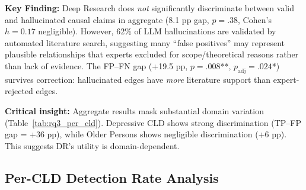 \textbf{Key Finding:} Deep Research does \textit{not} significantly discriminate between valid and hallucinated causal claims in aggregate (8.1 pp gap, $p=.38$, Cohen's $h=0.17$ negligible). However, 62\% of LLM hallucinations are validated by automated literature search, suggesting many ``false positives'' may represent plausible relationships that experts excluded for scope/theoretical reasons rather than lack of evidence. The FP--FN gap (+19.5 pp, $p=.008$**, $p_{\text{adj}}=.024$*) survives correction: hallucinated edges have \textit{more} literature support than expert-rejected edges.

\textbf{Critical insight:} Aggregate results mask substantial domain variation (Table~\ref{tab:rq3_per_cld}). Depressive CLD shows strong discrimination (TP--FP gap = +36 pp), while Older Persons shows negligible discrimination (+6 pp). This suggests DR's utility is domain-dependent.

\subsection{Per-CLD Detection Rate Analysis}


